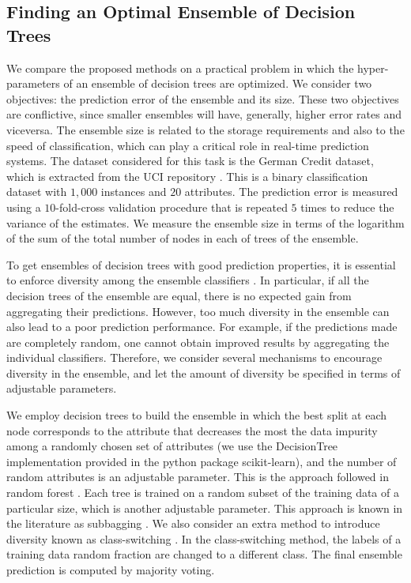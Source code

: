 \subsection{Finding an Optimal Ensemble of Decision Trees}

We compare the proposed methods on a practical problem in which the hyper-parameters of an
ensemble of decision trees are optimized. We consider two objectives: the prediction error of the
ensemble and its size. These two objectives are conflictive, since smaller ensembles will have, generally, higher error rates and viceversa. 
The ensemble size is related to the storage requirements and
also to the speed of classification, which can play a critical role in real-time prediction systems.
The dataset considered for this task is the German Credit dataset, which is extracted from the UCI repository \citep{Dua2017}.
This is a binary classification dataset with $1,000$ instances and $20$ attributes. The prediction error is
measured using a $10$-fold-cross validation procedure that is repeated $5$ times to reduce the variance of the estimates.
We measure the ensemble size in terms of the logarithm of the sum of the total number of nodes in each of trees of
the ensemble.

To get ensembles of decision trees with good prediction properties, it is essential to enforce diversity among the
ensemble classifiers \citep{dietterich2000ensemble}. In particular, if all the decision trees of the ensemble are
equal, there is no expected gain from aggregating their predictions. However, too much diversity in the ensemble
can also lead to a poor prediction performance. For example, if the predictions made are completely random,
one cannot obtain improved results by aggregating the individual classifiers. Therefore, we consider 
several mechanisms to encourage diversity in the ensemble, and let the amount of diversity be specified in terms of adjustable parameters.

We employ decision trees to build the ensemble in which the best split at each node corresponds
to the attribute that decreases the most the data impurity among a randomly chosen set
of attributes (we use the DecisionTree implementation provided in the python package
scikit-learn), and the number of random attributes is an adjustable parameter.
This is the approach followed in random forest \citep{breiman2001random}. Each tree
is trained on a random subset of the training data of a particular size,
which is another adjustable parameter. This approach is known in the literature
as subbagging \citep{buhlmann2002analyzing}. We also consider an extra method to introduce
diversity known as class-switching \citep{martinez2005switching}. In the class-switching method, the labels
of a training data random fraction are changed to a different class. The final ensemble prediction
is computed by majority voting.

